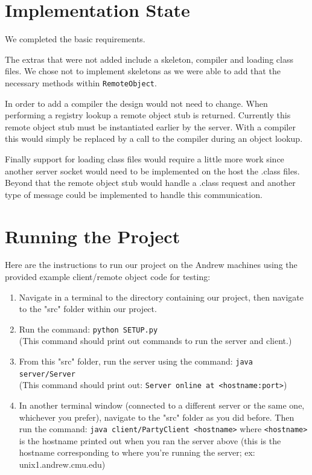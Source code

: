 \documentclass[12pt]{article}
\begin{document}

\section{Implementation State}

We completed the basic requirements.

The extras that were not added include a skeleton, compiler and loading class files. We chose not to implement skeletons as we were able to add that the necessary methods within \texttt{RemoteObject}.

In order to add a compiler the design would not need to change. When performing a registry lookup a remote object stub is returned. Currently this remote object stub must be instantiated earlier by the server. With a compiler this would simply be replaced by a call to the compiler during an object lookup.

Finally support for loading class files would require a little more work since another server socket would need to be implemented on the host the .class files. Beyond that the remote object stub would handle a .class request and another type of message could be implemented to handle this communication.


\section{Running the Project}

Here are the instructions to run our project on the Andrew machines using the provided example client/remote object code for testing: 

\begin{enumerate}
	\item{Navigate in a terminal to the directory containing our project, then navigate to the "src" folder within our project.}
	\item{Run the command: \verb|python SETUP.py| \\ (This command should print out commands to run the server and client.)}
	\item{From this "src" folder, run the server using the command: \verb|java server/Server| \\ (This command should print out: \verb|Server online at <hostname:port>|)}
	\item{In another terminal window (connected to a different server or the same one, whichever you prefer), navigate to the "src" folder as you did before. Then run the command: \verb|java client/PartyClient <hostname>| where \verb|<hostname>| is the hostname printed out when you ran the server above (this is the hostname corresponding to where you're running the server; ex: unix1.andrew.cmu.edu)}
\end{enumerate}
\end{document}
